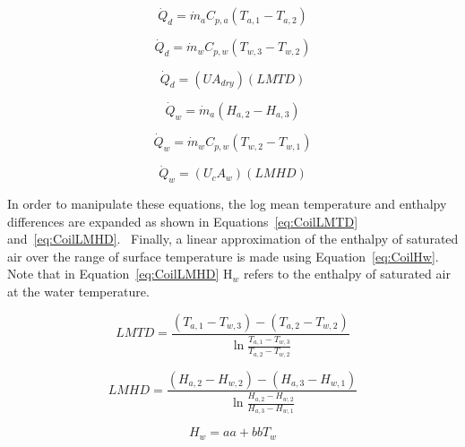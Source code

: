 \begin{equation}
{\dot Q_d} = {\dot m_a}C_{p,a}\left( {{T_{a,1}} - {T_{a,2}}} \right)
\label{eq:QdDotmCpdT}
\end{equation}

\begin{equation}
{\dot Q_d} = {\dot m_w}C_{p,w}\left( {{T_{w,3}} - {T_{w,2}}} \right)
\end{equation}

\begin{equation}
{\dot Q_d} = \left( {U{A_{dry}}} \right)\left( {LMTD} \right)
\end{equation}

\begin{equation}
{\dot Q_w} = {\dot m_a}\left( {{H_{a,2}} - {H_{a,3}}} \right)
\label{eq:QwDotmdH}
\end{equation}

\begin{equation}
{\dot Q_w} = {\dot m_w}C_{p,w}\left( {{T_{w,2}} - {T_{w,1}}} \right)
\label{eq:QwDotmCpdT}
\end{equation}

\begin{equation}
{\dot Q_w} = \left( {{U_c}{A_w}} \right)\left( {LMHD} \right)
\label{eq:QwDotUALMHD}
\end{equation}

In order to manipulate these equations, the log mean temperature and enthalpy differences are expanded as shown in Equations~\ref{eq:CoilLMTD} and~\ref{eq:CoilLMHD}.~ Finally, a linear approximation of the enthalpy of saturated air over the range of surface temperature is made using Equation~\ref{eq:CoilHw}.~ Note that in Equation~\ref{eq:CoilLMHD} H\(_w\) refers to the enthalpy of saturated air at the water temperature.

\begin{equation}
LMTD = \frac{{\left( {{T_{a,1}} - {T_{w,3}}} \right) - \left( {{T_{a,2}} - {T_{w,2}}} \right)}}{{\ln \frac{{{T_{a,1}} - {T_{w,3}}}}{{{T_{a,2}} - {T_{w,2}}}}}}
\label{eq:CoilLMTD}
\end{equation}

\begin{equation}
LMHD = \frac{{\left( {{H_{a,2}} - {H_{w,2}}} \right) - \left( {{H_{a,3}} - {H_{w,1}}} \right)}}{{\ln \frac{{{H_{a,2}} - {H_{w,2}}}}{{{H_{a,3}} - {H_{w,1}}}}}}
\label{eq:CoilLMHD}
\end{equation}

\begin{equation}
{H_w} = aa + bb {T_w}
\label{eq:CoilHw}
\end{equation}


